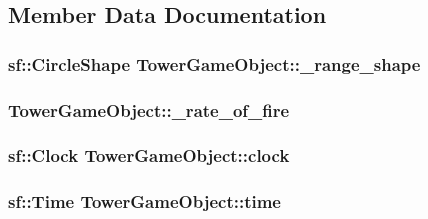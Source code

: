 \subsection{Member Data Documentation}
\hypertarget{class_tower_game_object_a3c154fe0b6a056540332b0c40d60304f}{
\subsubsection[{\+\_\+range\+\_\+shape}]{\setlength{\rightskip}{0pt plus 5cm}sf\+::\+Circle\+Shape Tower\+Game\+Object\+::\+\_\+range\+\_\+shape\hspace{0.3cm}{\ttfamily [protected]}}}\label{class_tower_game_object_a3c154fe0b6a056540332b0c40d60304f}
\hypertarget{class_tower_game_object_a791d99099306673e85ed6b93fd6f7b1b}{
\subsubsection[{\+\_\+rate\+\_\+of\+\_\+fire}]{ Tower\+Game\+Object\+::\+\_\+rate\+\_\+of\+\_\+fire\hspace{0.3cm}{\ttfamily [protected]}}}\label{class_tower_game_object_a791d99099306673e85ed6b93fd6f7b1b}
\hypertarget{class_tower_game_object_a5c5f8162877828c20bf937c90338205c}{
\subsubsection[{clock}]{\setlength{\rightskip}{0pt plus 5cm}sf\+::\+Clock Tower\+Game\+Object\+::clock\hspace{0.3cm}{\ttfamily [protected]}}}\label{class_tower_game_object_a5c5f8162877828c20bf937c90338205c}
\hypertarget{class_tower_game_object_ade7e1ea2089b38f90fa3920a80a3619a}{
\subsubsection[{time}]{\setlength{\rightskip}{0pt plus 5cm}sf\+::\+Time Tower\+Game\+Object\+::time\hspace{0.3cm}{\ttfamily [protected]}}}\label{class_tower_game_object_ade7e1ea2089b38f90fa3920a80a3619a}


